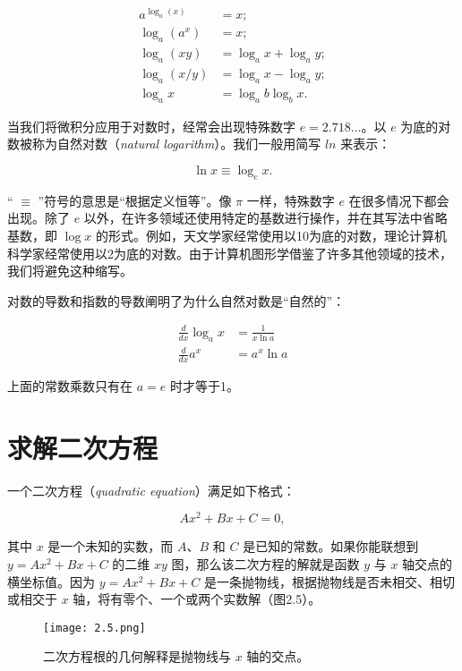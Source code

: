 \documentclass[lang=cn,12pt]{elegantbook}
\begin{document}
$$
  \begin{aligned}
    a^{\log_a(x)} & = x;               \\
    \log_a(a^x)   & = x;               \\
    \log_a(xy)    & = \log_ax+\log_ay; \\
    \log_a(x/y)   & = \log_ax-\log_ay; \\
    \log_ax       & = \log_ab\log_bx.
  \end{aligned}
$$

当我们将微积分应用于对数时，经常会出现特殊数字 $e=2.718\ldots $。以 $e$ 为底的对数被称为自然对数（\textit{natural logarithm}）。我们一般用简写 $ln$ 来表示：

$$\ln x \equiv \log_ex.$$

“ $\equiv$ ”符号的意思是“根据定义恒等”。像 $\pi$ 一样，特殊数字 $e$ 在很多情况下都会出现。除了 $e$ 以外，在许多领域还使用特定的基数进行操作，并在其写法中省略基数，即 $\log x$ 的形式。例如，天文学家经常使用以10为底的对数，理论计算机科学家经常使用以2为底的对数。由于计算机图形学借鉴了许多其他领域的技术，我们将避免这种缩写。

对数的导数和指数的导数阐明了为什么自然对数是“自然的”：

$$
  \begin{aligned}
    \frac{d}{d x} \log _{a} x & =\frac{1}{x \ln a} \\
    \frac{d}{d x} a^{x}       & =a^{x} \ln a
  \end{aligned}
$$

上面的常数乘数只有在 $a = e$ 时才等于1。

\section{求解二次方程}

一个二次方程（\textit{quadratic equation}）满足如下格式：

$$ Ax^2+Bx+C=0, $$

其中 $x$ 是一个未知的实数，而 $A$、$B$ 和 $C$ 是已知的常数。如果你能联想到 $y=Ax^2+Bx+C$ 的二维 $xy$ 图，那么该二次方程的解就是函数 $y$ 与 $x$ 轴交点的横坐标值。因为 $y=Ax^2+Bx+C$ 是一条抛物线，根据抛物线是否未相交、相切或相交于 $x$ 轴，将有零个、一个或两个实数解（图2.5）。

\begin{figure}[htbp]
  \centering
  \texttt{[image: 2.5.png]}
  \caption{二次方程根的几何解释是抛物线与 $x$ 轴的交点。}
\end{figure}
\end{document}
